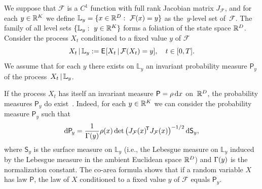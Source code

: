 \documentclass{article}
\newcommand{\obs}{\mathcal{F}} %
\newcommand{\levs}{\mathbb{L}} %
\newcommand{\invm}{\mathsf{P}} %
\newcommand{\invd}{\rh} %
\newcommand{\jac}[1]{J_{#1}} %
\begin{document}
We suppose that $\obs$ is a $C^1$ function with full rank Jacobian matrix $\jac{\obs}$, and for each $y\in\mathbb{R}^K$ we define $\levs_y=\{x\in\R^D:\ \obs(x)=y\}$ as the~$y$-level set of~$\obs$. The family of all level sets $\{\levs_y:\ y\in\R^K\}$ forms a foliation of the state space $\mathbb{R}^D$. Consider the process $X_t$ conditioned to a fixed value $y$ of $\obs$
\begin{equation*}
    X_t\cbar\levs_y := \Exp[][X_t\cbar \obs(X_t)=y],\quad t\in[0,T].
\end{equation*}
We assume that for each $y$ there exists on $\levs_y$ an invariant probability measure $\invm_{\!y}$ of the process~$X_t\cbar\levs_y$.\medskip

\begin{rem}
If the process $X_t$ has itself an invariant measure $\invm=\invd\der{x}$ on~$\mathbb{R}^D$, the probability measures $\invm_{\!y}$ do exist~\cite{legoll_effective_2010}. Indeed, for each $y\in\mathbb{R}^K$ we can consider the probability measure $\invm_{\!y}$ such that
\begin{equation}
    \der{\invm_{\!y}} = \frac{1}{\Ga(y)}\rh(x)\det\big(\tp{\jac{\obs}(x)}\jac{\obs}(x)\big)^{-1/2}\der{\mathsf{S}_y},
\end{equation}
where $\mathsf{S}_y$ is the surface measure on $\levs_y$ (i.e., the Lebesgue measure on $\levs_y$ induced by the Lebesgue measure in the ambient Euclidean space $\mathbb{R}^D$) and $\Gamma(y)$ is the normalization constant.
The co-area formula shows that if a random variable $X$ has law $\invm$, the law of $X$ conditioned to a fixed value $y$ of $\obs$ equals $\invm_{\!y}$.
\end{rem}
\end{document}
